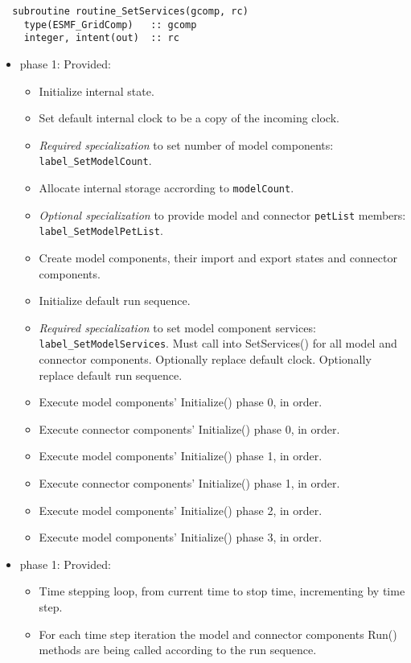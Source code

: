 \begin{verbatim}  subroutine routine_SetServices(gcomp, rc)
    type(ESMF_GridComp)   :: gcomp
    integer, intent(out)  :: rc
\end{verbatim}

\begin{itemize}
\item phase 1: {\sc Provided:}
  \begin{itemize}
  \item Initialize internal state.
  \item Set default internal clock to be a copy of the incoming clock.
  \item {\it Required specialization} to set number of model components: {\tt label\_SetModelCount}.
  \item Allocate internal storage accrording to {\tt modelCount}.
  \item {\it Optional specialization} to provide model and connector {\tt petList} members: {\tt label\_SetModelPetList}.
  \item Create model components, their import and export states and connector components.
  \item Initialize default run sequence.
  \item {\it Required specialization} to set model component services: {\tt label\_SetModelServices}. Must call into SetServices() for all model and connector components. Optionally replace default clock. Optionally replace default run sequence.
  \item Execute model components' Initialize() phase 0, in order.
  \item Execute connector components' Initialize() phase 0, in order.
  \item Execute model components' Initialize() phase 1, in order.
  \item Execute connector components' Initialize() phase 1, in order.
  \item Execute model components' Initialize() phase 2, in order.
  \item Execute model components' Initialize() phase 3, in order.
  \end{itemize}  
\end{itemize}

\begin{itemize}
\item phase 1: {\sc Provided:}
  \begin{itemize}
  \item Time stepping loop, from current time to stop time, incrementing by time step.
  \item For each time step iteration the model and connector components Run() methods are being called according to the run sequence.
  \end{itemize}    
\end{itemize}

